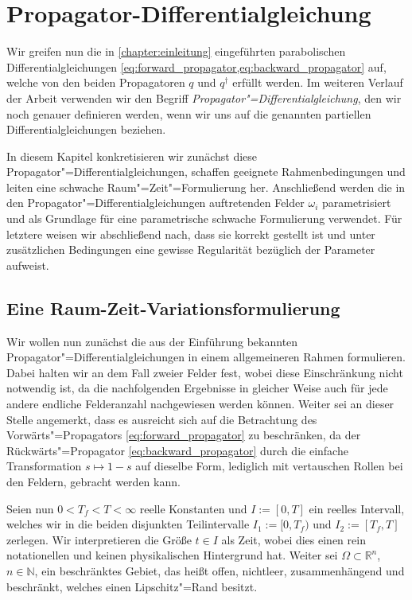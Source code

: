 \documentclass[../main.tex]{subfiles}
\begin{document}
\chapter{Propagator-Differentialgleichung} %
\label{chapter:propagator_differentialgleichung}

Wir greifen nun die in \cref{chapter:einleitung} eingeführten parabolischen Differentialgleichungen \cref{eq:forward_propagator,eq:backward_propagator} auf, welche von den beiden Propagatoren $q$ und $q^{\dagger}$ erfüllt werden.
Im weiteren Verlauf der Arbeit verwenden wir den Begriff \emph{Propagator"=Differentialgleichung}, den wir noch genauer definieren werden, wenn wir uns
auf die genannten partiellen Differentialgleichungen beziehen.

In diesem Kapitel konkretisieren wir zunächst diese Propagator"=Differentialgleichungen, schaffen geeignete Rahmenbedingungen und leiten eine schwache Raum"=Zeit"=Formulierung her.
Anschließend werden die in den Propagator"=Differentialgleichungen auftretenden Felder $\omega_{i}$ parametrisiert und als Grundlage für eine parametrische schwache Formulierung verwendet.
Für letztere weisen wir abschließend nach, dass sie korrekt gestellt ist und unter zusätzlichen Bedingungen eine gewisse Regularität bezüglich der Parameter aufweist.


\section{Eine Raum-Zeit-Variationsformulierung}
\label{section:raum_zeit_variationsformulierung}

Wir wollen nun zunächst die aus der Einführung bekannten Propagator"=Differentialgleichungen in einem allgemeineren Rahmen formulieren.
Dabei halten wir an dem Fall zweier Felder fest, wobei diese Einschränkung nicht notwendig ist, da die nachfolgenden Ergebnisse in gleicher Weise auch für jede andere endliche Felderanzahl nachgewiesen werden können.
Weiter sei an dieser Stelle angemerkt, dass es ausreicht sich auf die Betrachtung des Vorwärts"=Propagators \cref{eq:forward_propagator} zu beschränken, da der Rückwärts"=Propagator \cref{eq:backward_propagator} durch die einfache Transformation $s \mapsto 1 - s$ auf dieselbe Form, lediglich mit vertauschen Rollen bei den Feldern, gebracht werden kann.

Seien nun $0 < T_{f} < T < \infty$ reelle Konstanten und $I := [0, T]$ ein reelles Intervall, welches wir in die beiden disjunkten Teilintervalle $I_{1} := [0, T_{f})$ und $I_{2} := [T_{f}, T]$ zerlegen.
Wir interpretieren die Größe $t \in I$ als Zeit, wobei dies einen rein notationellen und keinen physikalischen Hintergrund hat.
Weiter sei $\Omega \subset \mathbb{R}^{n}$, $n \in \mathbb{N}$, ein beschränktes Gebiet, das heißt offen, nichtleer, zusammenhängend und beschränkt, welches einen Lipschitz"=Rand besitzt.
\end{document}
